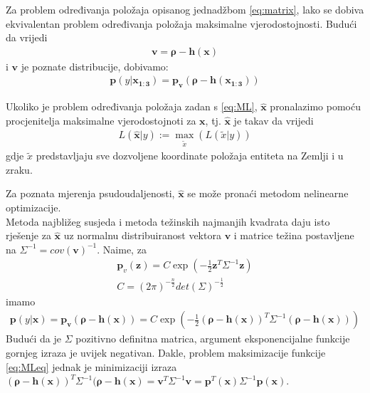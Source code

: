 \documentclass[a4paper,twoside,12pt]{memoir} %
\begin{document}
Za problem određivanja položaja opisanog
jednadžbom \ref{eq:matrix}, lako se dobiva ekvivalentan problem određivanja položaja
 maksimalne vjerodostojnosti.
Budući da vrijedi
\begin{align*}
\mathbf{v} = \mathbf{\rho}-\mathbf{h}(\mathbf{x})
\end{align*}%
i $\mathbf{v}$ je poznate distribucije, dobivamo:
\begin{align}\label{eq:ML}
\mathbf{p}( y|\mathbf{x_{1:3}} ) = \mathbf{p_v} \left(\mathbf{\rho}-\mathbf{h}(\mathbf{x_{1:3}}) \right)
\end{align}

Ukoliko je problem određivanja položaja zadan s \ref{eq:ML},
$\hat{\mathbf{x}}$ pronalazimo pomoću procjenitelja maksimalne vjerodostojnoti za $\mathbf{x}$, tj. $\hat{\mathbf{x}}$ je takav da vrijedi
\begin{align}
	L(\hat{\mathbf{x}} | y) := \max_{\tilde{x}} (L(\tilde{x} | y)) 
\end{align}
gdje $\tilde{x}$ predstavljaju sve dozvoljene 
koordinate položaja entiteta na Zemlji i u zraku.

Za poznata mjerenja psudoudaljenosti, $\hat{\mathbf{x}}$ se može pronaći metodom nelinearne optimizacije.\\
Metoda najbližeg susjeda i metoda težinskih najmanjih kvadrata daju isto rješenje za  $\hat{\mathbf{x}}$ uz normalnu distribuiranost vektora $\mathbf{v}$ i matrice težina postavljene na $\Sigma^{-1} = cov(\mathbf{v})^{-1}$.
Naime, za
\begin{align*}
\mathbf{p}_v (\mathbf{z}) = C \exp \left(-\frac{1}{2} \mathbf{z}^T \Sigma^{-1} \mathbf{z}\right) \\
C = (2\pi)^{-\frac{n}{2}}det (\Sigma)^{-\frac{1}{2}}
\end{align*}
imamo
\begin{align}\label{eq:MLeq}
\mathbf{p}( y|\mathbf{x} ) = \mathbf{p_v} \left(\mathbf{\rho}-\mathbf{h}(\mathbf{x}) \right)
= C \exp \left(-\frac{1}{2} (\mathbf{\rho}-\mathbf{h}(\mathbf{x}) )^T \Sigma^{-1} (\mathbf{\rho}-\mathbf{h}(\mathbf{x}) )\right)
\end{align}
Budući da je $\Sigma$ pozitivno definitna matrica, argument eksponencijalne funkcije gornjeg izraza je uvijek negativan.
Dakle, problem maksimizacije funkcije \ref{eq:MLeq} jednak je minimizaciji
izraza $(\mathbf{\rho}-\mathbf{h}(\mathbf{x}) )^T \Sigma^{-1} (\mathbf{\rho}-\mathbf{h}(\mathbf{x}) = \mathbf{v}^T \Sigma^{-1}\mathbf{v} = 
\mathbf{p}^T (\mathbf{x}) \Sigma^{-1}\mathbf{p} (\mathbf{x})$.
\end{document}
